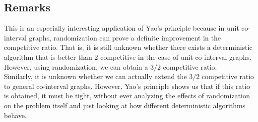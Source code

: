 \subsection{Remarks}
This is an especially interesting application of Yao's principle because in unit co-interval graphs, randomization can prove a definite improvement in the competitive ratio. That is, it is still unknown whether there exists a deterministic algorithm that is better than 2-competitive in the case of unit co-interval graphs. However, using randomization, we can obtain a $3/2$ competitive ratio.
\\Similarly, it is unknown whether we can actually extend the $3/2$ competitive ratio to general co-interval graphs. However, Yao's principle shows us that if this ratio is obtained, it must be tight, without ever analyzing the effects of randomization on the problem itself and just looking at how different deterministic algorithms behave.
